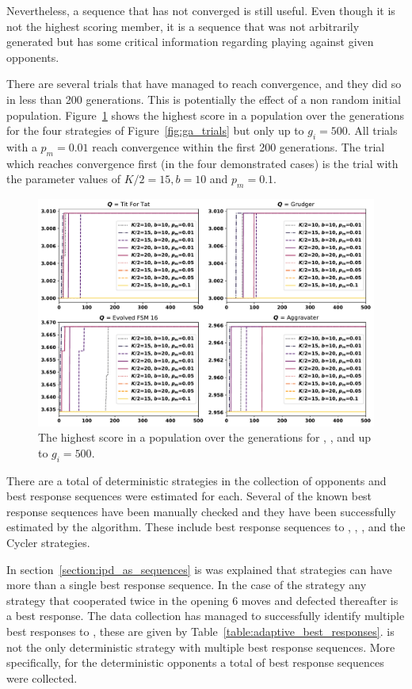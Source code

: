 Nevertheless, a sequence that has not converged is still useful. Even though
it is not the highest scoring member, it is a sequence that was not arbitrarily
generated but has some critical information regarding playing against given
opponents.

There are several trials that have managed to reach convergence,
and they did so in less than 200 generations. This is potentially the effect of a
non random initial population.
Figure~\ref{fig:ga_trials_to_500}
shows the highest score in a population over the generations for the four
strategies of Figure~\ref{fig:ga_trials} but only up to \(g_i = 500\). All trials
with a \(p_m=0.01\) reach convergence within the first 200 generations. The trial
which reaches convergence first (in the four demonstrated cases) is the trial
with the parameter values of \(K/2=15, b=10\) and \(p_m=0.1\).

\begin{figure}[!htbp]
    \centering
    \includegraphics[width=.9\textwidth]{src/chapters/06/img/gas_results_per_trial_to_generation_500.pdf}
    \caption{The highest score in a population over the generations for \TitForTat,
    \Grudger, \FSMSixTeen and \Aggravater up to \(g_i = 500\).}\label{fig:ga_trials_to_500}
\end{figure}

There are a total of \deterministicstrategies deterministic strategies in the
collection of opponents and best response sequences were estimated for each.
Several of the known best response sequences have been manually checked and they
have been successfully estimated by the algorithm. These include best response
sequences to \TitForTat, \Grudger, \Alternator, \Pavlov and the Cycler strategies.

In section~\ref{section:ipd_as_sequences} is was explained that strategies can
have more than a single best response sequence. In the case of the strategy
\Adaptive any strategy that cooperated twice in the opening 6 moves and defected
thereafter is a best response. The data collection has managed to successfully identify
multiple best responses to \Adaptive, these are given by
Table~\ref{table:adaptive_best_responses}. \Adaptive is not the only
deterministic strategy with multiple best response sequences. More specifically,
for the \deterministicstrategies deterministic opponents a total of \deterministicsequences best
response sequences were collected.

